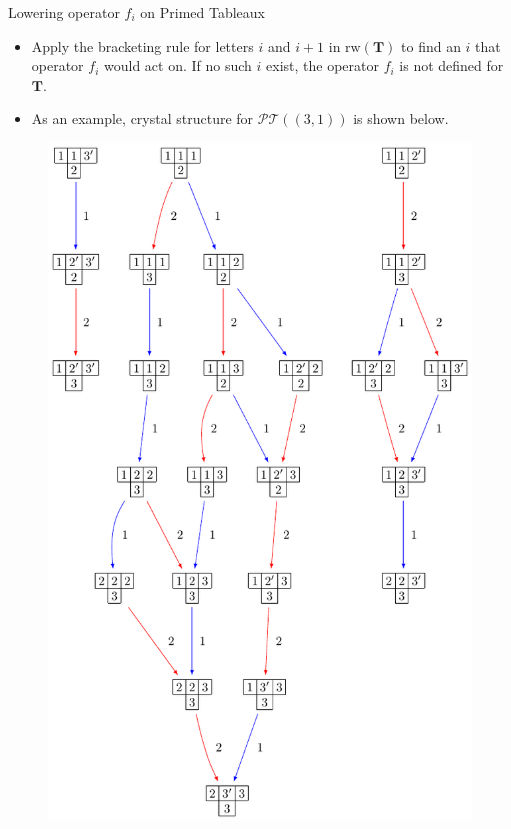 \documentclass[final]{beamer}
\newlength{\onecolwid}
\begin{document}
\begin{frame}[t]
\begin{columns}[t]
\begin{column}{\onecolwid}
\begin{block}{Lowering operator $f_i$ on Primed Tableaux}
\begin{itemize}
\item Apply the bracketing rule for letters $i$ and $i+1$ in $\mathrm{rw}(\mathbf{T})$ to find an $i$ that operator $f_i$ would act on. If no such $i$ exist, the operator $f_i$ is not defined for $\mathbf{T}$.

\item As an example, crystal structure for $\mathcal{PT} ((3,1))$ is shown below.
\end{itemize}


\begin{figure}
\includegraphics[scale=1.55]{Crystal_Shifted}
\centering
\end{figure}


\end{block}
\end{column}
\end{columns}
\end{frame}
\end{document}
